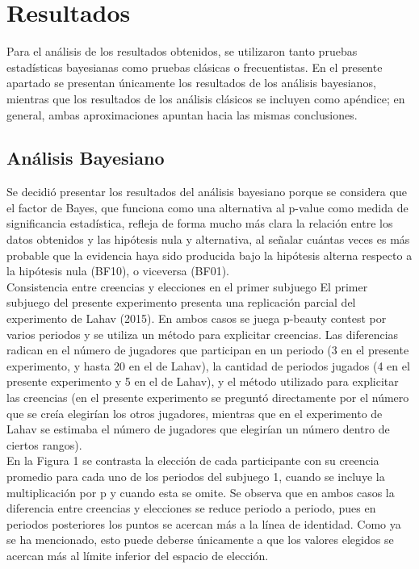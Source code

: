 \chapter{Resultados} %
\label{Cap_Res} %

Para el análisis de los resultados obtenidos, se utilizaron tanto pruebas estadísticas bayesianas como pruebas clásicas o frecuentistas. En el presente apartado se presentan únicamente los resultados de los análisis bayesianos, mientras que los resultados de los análisis clásicos se incluyen como apéndice; en general, ambas aproximaciones apuntan hacia las mismas conclusiones.\\

\section{Análisis Bayesiano}

Se decidió presentar los resultados del análisis bayesiano porque se considera que el factor de Bayes, que funciona como una alternativa al p-value como medida de significancia estadística, refleja de forma mucho más clara la  relación entre los datos obtenidos y las hipótesis nula y alternativa, al señalar cuántas veces es más probable que la evidencia haya sido producida bajo la hipótesis alterna respecto a la hipótesis nula (BF10), o viceversa (BF01).\\

Consistencia entre creencias y elecciones en el primer subjuego
El primer subjuego del presente experimento presenta una replicación parcial del experimento de Lahav (2015). En ambos casos se juega p-beauty contest por varios periodos y se utiliza un método para explicitar creencias. Las diferencias radican en el número de jugadores que participan en un periodo (3 en el presente experimento, y hasta 20 en el de Lahav), la cantidad de periodos jugados (4 en el presente experimento y 5 en el de Lahav), y el método utilizado para explicitar las creencias (en el presente experimento se preguntó directamente por el número que se creía elegirían los otros jugadores, mientras que en el experimento de Lahav se estimaba el número de jugadores que elegirían un número dentro de ciertos rangos).\\

En la Figura 1 se contrasta la elección de cada participante con su creencia promedio para cada uno de los periodos del subjuego 1, cuando se incluye la multiplicación por p y cuando esta se omite. Se observa que en ambos casos la diferencia entre creencias y elecciones se reduce periodo a periodo, pues en periodos posteriores los puntos se acercan más a la línea de identidad. Como ya se ha mencionado, esto puede deberse únicamente a que los valores elegidos se acercan más al límite inferior del espacio de elección.\\

